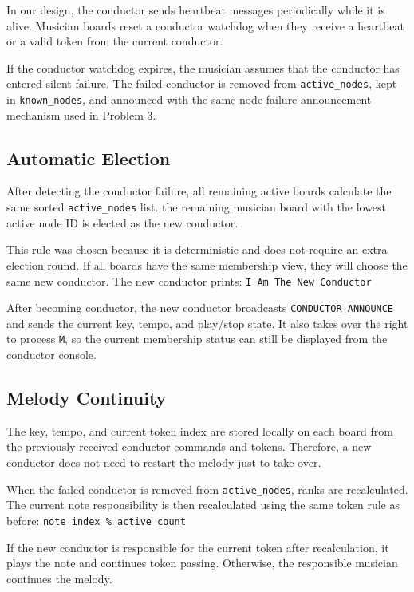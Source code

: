 \documentclass[11pt,a4paper]{article}
\begin{document}
In our design, the conductor sends heartbeat messages periodically while it is alive. Musician boards reset a conductor watchdog when they receive a heartbeat or a valid token from the current conductor.

If the conductor watchdog expires, the musician assumes that the conductor has entered silent failure. The failed conductor is removed from \texttt{active\_\allowbreak{}nodes}, kept in \texttt{known\_\allowbreak{}nodes}, and announced with the same node-failure announcement mechanism used in Problem 3.

\subsection*{Automatic Election}

After detecting the conductor failure, all remaining active boards calculate the same sorted \texttt{active\_\allowbreak{}nodes} list. the remaining musician board with the lowest active node ID is elected as the new conductor.

This rule was chosen because it is deterministic and does not require an extra election round. If all boards have the same membership view, they will choose the same new conductor. The new conductor prints: \texttt{I Am The New Conductor}

After becoming conductor, the new conductor broadcasts \texttt{CONDUCTOR\_\allowbreak{}ANNOUNCE} and sends the current key, tempo, and play/stop state. It also takes over the right to process \texttt{M}, so the current membership status can still be displayed from the conductor console.

\subsection*{Melody Continuity}

The key, tempo, and current token index are stored locally on each board from the previously received conductor commands and tokens. Therefore, a new conductor does not need to restart the melody just to take over.

When the failed conductor is removed from \texttt{active\_\allowbreak{}nodes}, ranks are recalculated. The current note responsibility is then recalculated using the same token rule as before: \texttt{note\_\allowbreak{}index \% active\_\allowbreak{}count}

If the new conductor is responsible for the current token after recalculation, it plays the note and continues token passing. Otherwise, the responsible musician continues the melody.
\end{document}
